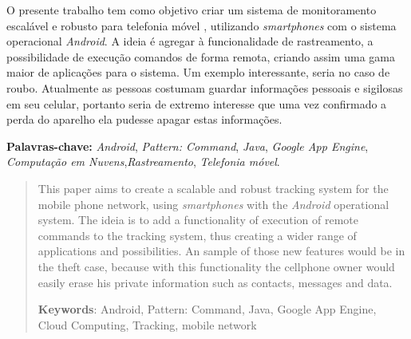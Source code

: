 \begin{resumo}

    O presente trabalho tem como objetivo criar um sistema de monitoramento escalável e robusto para telefonia móvel , utilizando \emph{smartphones} com o sistema operacional \emph{Android}. A ideia é agregar à funcionalidade 
de rastreamento, a possibilidade de execução comandos de forma remota, criando assim uma gama maior de aplicações para o sistema. Um exemplo interessante, seria no caso de roubo. Atualmente as pessoas costumam guardar 
informações pessoais e sigilosas  em seu celular, portanto seria de extremo interesse que uma vez confirmado a perda do aparelho ela pudesse apagar estas informações.
    
    \par
    \textbf{Palavras-chave:} \emph{Android}, \emph{Pattern: Command}, \emph{Java}, \emph{Google App Engine}, \emph{Computação em Nuvens},\emph{Rastreamento}, \emph{Telefonia móvel}.
\end{resumo}


\begin{abstract}
	
    This paper aims to create a scalable and robust  tracking system for the mobile phone network, using \emph{smartphones} with the \emph{Android} operational system.
The ideia is to add a functionality of execution of remote commands to the tracking system, thus creating a wider range of applications and possibilities. An sample of those new 
features would be in the theft case, because with this functionality the cellphone  owner would easily erase his private information such as contacts, messages and data. 

    \par
    \textbf{Keywords}: Android, Pattern: Command, Java, Google App Engine, Cloud Computing, Tracking, mobile network	
\end{abstract}
